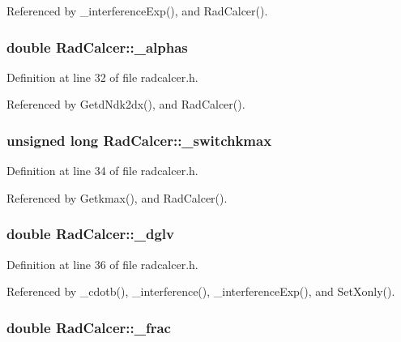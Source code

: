 Referenced by \_\-interferenceExp(), and RadCalcer().
\subsubsection{\setlength{\rightskip}{0pt plus 5cm}double {\bf RadCalcer::\_\-alphas}\hspace{0.3cm}{\tt  [private]}}\label{classRadCalcer_9f5300f48831979c9e3ded4590f436cd}




Definition at line 32 of file radcalcer.h.

Referenced by GetdNdk2dx(), and RadCalcer().
\subsubsection{\setlength{\rightskip}{0pt plus 5cm}unsigned long {\bf RadCalcer::\_\-switchkmax}\hspace{0.3cm}{\tt  [private]}}\label{classRadCalcer_f1ff30d453eb9d66719563097494fdad}




Definition at line 34 of file radcalcer.h.

Referenced by Getkmax(), and RadCalcer().
\subsubsection{\setlength{\rightskip}{0pt plus 5cm}double {\bf RadCalcer::\_\-dglv}\hspace{0.3cm}{\tt  [private]}}\label{classRadCalcer_2dcf1fb0c50fa384f6b59055feaa4113}




Definition at line 36 of file radcalcer.h.

Referenced by \_\-cdotb(), \_\-interference(), \_\-interferenceExp(), and SetXonly().
\subsubsection{\setlength{\rightskip}{0pt plus 5cm}double {\bf RadCalcer::\_\-frac}\hspace{0.3cm}{\tt  [private]}}\label{classRadCalcer_3d123970055fd9730243b0d4a4295ab5}




